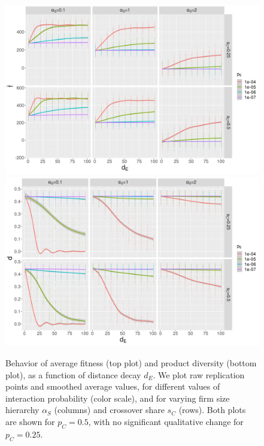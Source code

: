 \documentclass[letterpaper]{article}
\begin{document}
\begin{figure}
\begin{center}
\includegraphics[width=0.9\linewidth]{averageFitness-distanceDecay_color-interactionProba_facet-crossOverShare-firmSizeScaling_crossOverProba0.5.png}\\
\includegraphics[width=0.9\linewidth]{diversity-distanceDecay_color-interactionProba_facet-crossOverShare-firmSizeScaling_crossOverProba0.5.png}\\
\caption{Behavior of average fitness (top plot) and product diversity (bottom plot), as a function of distance decay $d_E$. We plot raw replication points and smoothed average values, for different values of interaction probability (color scale), and for varying firm size hierarchy $\alpha_S$ (columns) and crossover share $s_C$ (rows). Both plots are shown for $p_C = 0.5$, with no significant qualitative change for $p_C = 0.25$.}
\label{fig:fig1}
\end{center}
\end{figure}
\end{document}
